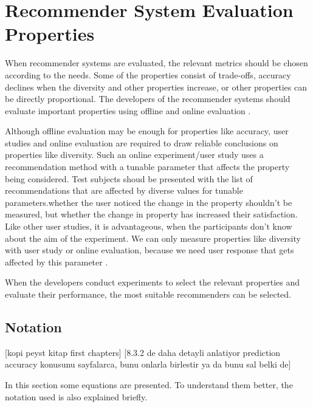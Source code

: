 
\section{Recommender System Evaluation Properties}\label{section:evaluation_metrics}

When recommender systems are evaluated, the relevant metrics should be chosen according to the needs. Some of the properties consist of trade-offs, accuracy declines when the diversity and other properties increase, or other properties can be directly proportional. The developers of the recommender systems should evaluate important properties using offline and online evaluation \cite{shani2011evaluating}.

Although offline evaluation may be enough for properties like accuracy, user studies and online evaluation are required to draw reliable conclusions on properties like diversity. Such an online experiment/user study uses a recommendation method with a tunable parameter that affects the property being considered. Test subjects shoud be presented with the list of recommendations that are affected by diverse values for tunable parameters.whether the user noticed the change in the property shouldn't be measured, but whether the change in property has increased their satisfaction. Like other user studies, it is advantageous, when the participants don't know about the aim of the experiment. We can only measure properties like diversity with user study or online evaluation, because we need user response that gets affected by this parameter \cite{shani2011evaluating}.

When the developers conduct experiments to select the relevant properties and evaluate their performance, the most suitable recommenders can be selected.

\subsection{Notation}
[kopi peyst kitap first chapters]
[8.3.2 de daha detayli anlatiyor prediction accuracy konusunu sayfalarca, bunu onlarla birlestir ya da bunu sal belki de]

In this section some equations are presented. To understand them better, the notation used is also explained briefly. 

